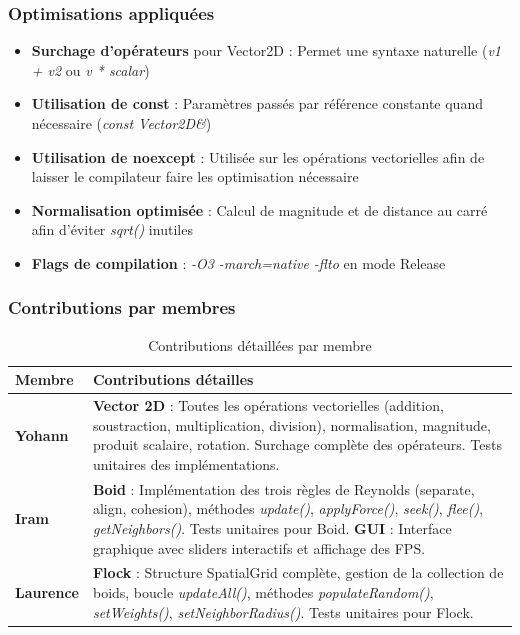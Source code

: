 \documentclass[11pt,a4paper]{article}
\begin{document}
\subsubsection{Optimisations appliquées}

\begin{itemize}
    \item \textbf{Surchage d'opérateurs} pour Vector2D : Permet une syntaxe naturelle (\textit{v1 + v2} ou \textit{v * scalar})
    \item \textbf{Utilisation de const} : Paramètres passés par référence constante quand nécessaire (\textit{const Vector2D\&})
    \item \textbf{Utilisation de noexcept} : Utilisée sur les opérations vectorielles afin de laisser le compilateur faire les optimisation nécessaire
    \item \textbf{Normalisation optimisée} : Calcul de magnitude et de distance au carré afin d'éviter \textit{sqrt()} inutiles
    \item \textbf{Flags de compilation} : \textit{-O3 -march=native -flto} en mode Release
\end{itemize}

\subsubsection{Contributions par membres}

\begin{table}[h]
    \centering
    \begin{tabular}{|p{4cm}|p{9cm}|}
        \hline
        \textbf{Membre} & \textbf{Contributions détailles}\\
        \hline
        \textbf{Yohann} & \textbf{Vector 2D} : Toutes les opérations vectorielles (addition, soustraction, multiplication, division), normalisation, magnitude, produit scalaire, rotation. Surchage complète des opérateurs. Tests unitaires des implémentations. \\
        \hline
        \textbf{Iram} & \textbf{Boid} : Implémentation des trois règles de Reynolds (separate, align, cohesion), méthodes \textit{update()}, \textit{applyForce()}, \textit{seek()}, \textit{flee()}, \textit{getNeighbors()}. Tests unitaires pour Boid. \textbf{GUI} : Interface graphique avec sliders interactifs et affichage des FPS. \\
        \hline
        \textbf{Laurence} & \textbf{Flock} : Structure SpatialGrid complète, gestion de la collection de boids, boucle \textit{updateAll()}, méthodes \textit{populateRandom()}, \textit{setWeights()}, \textit{setNeighborRadius()}. Tests unitaires pour Flock.\\
        \hline
    \end{tabular}
    \caption{Contributions détaillées par membre}
    \label{tab:contributions_detail}
\end{table}
\end{document}
